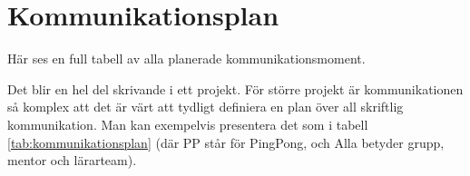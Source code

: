 \documentclass[a4paper]{article}
\begin{document}
\section{Kommunikationsplan}
\label{sec:kommunikationsplan}

Här ses en full tabell av alla planerade kommunikationsmoment.


\iffalse %
Det blir en hel del skrivande i ett projekt. För större projekt är
kommunikationen så komplex att det är värt att tydligt definiera en plan
över all skriftlig kommunikation. Man kan exempelvis presentera det som
i tabell \ref{tab:kommunikationsplan} (där PP står för PingPong, och Alla
betyder grupp, mentor och lärarteam).
\end{document}
